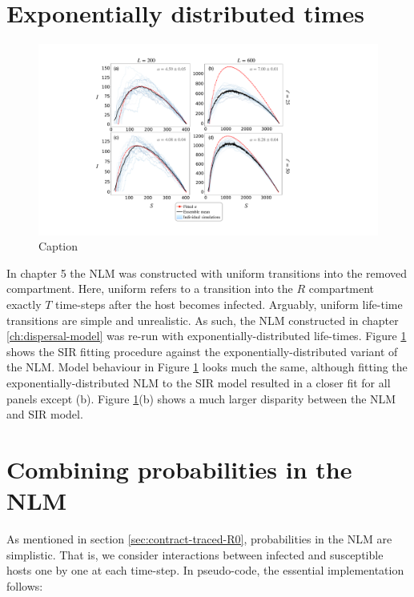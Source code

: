 \newpage

\section{Exponentially distributed times}

\begin{figure}[h]
    \centering
    \includegraphics[scale=0.4]{chapter5/figures/fig2-sir-fitting-exp.pdf}
    \caption{Caption}
    \label{fig:SIR-fitting-expontial}
\end{figure}


\label{a:exponentially-distributed-lt}
In chapter 5 the NLM was constructed with uniform transitions into the removed compartment. 
Here, uniform refers to a transition into the $R$ compartment exactly $T$ time-steps after the host becomes infected.
Arguably, uniform life-time transitions are simple and unrealistic.
As such, the NLM constructed in chapter \ref{ch:dispersal-model} was re-run with exponentially-distributed life-times. 
Figure \ref{fig:SIR-fitting-expontial} shows the SIR fitting procedure against the exponentially-distributed variant of the NLM. 
Model behaviour in Figure \ref{fig:SIR-fitting-expontial} looks much the same, although fitting the exponentially-distributed NLM to the SIR model resulted in a closer fit for all panels except (b). 
Figure \ref{fig:SIR-fitting-expontial}(b) shows a much larger disparity between the NLM and SIR model.


\newpage

\section{Combining probabilities in the NLM}
\label{A:combiniing-probabilities}

As mentioned in section \ref{sec:contract-traced-R0}, probabilities in the NLM are simplistic.
That is, we consider interactions between infected and susceptible hosts one by one at each time-step.
In pseudo-code, the essential implementation follows:

